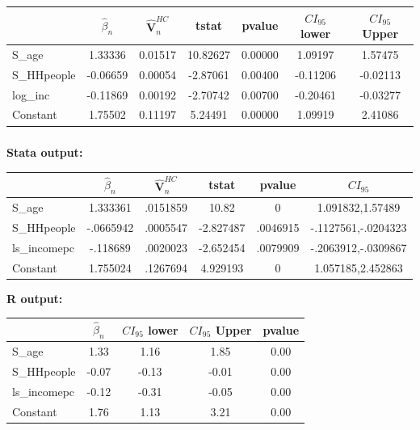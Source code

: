 \documentclass[12pt]{article}
\begin{document}
\begin{table}[ht]
\begin{tabular}{lcccccc}
  \hline
  &           $\hat \beta_n$&         $\mathbf{\hat V}_n^{HC}$ &           t\-stat &           p\-value &        $CI_{95}$ lower &  $CI_{95}$ Upper\\
  \hline
    S\_age & 1.33336 & 0.01517 & 10.82627 & 0.00000 & 1.09197 & 1.57475 \\
    S\_HHpeople & -0.06659 & 0.00054 & -2.87061 & 0.00400 & -0.11206 & -0.02113 \\
    log\_inc & -0.11869 & 0.00192 & -2.70742 & 0.00700 & -0.20461 & -0.03277 \\
  Constant & 1.75502 & 0.11197 & 5.24491 & 0.00000 & 1.09919 & 2.41086 \\
   \hline
\end{tabular}
\end{table}


\newpage
\subsubsection{}
\textbf{Stata output:}\\


\begin{tabular}{lccccc}
 &           $\hat \beta_n$&         $\mathbf{\hat V}_n^{HC}$ &           t\-stat &           p\-value &        $CI_{95}$\\
\hline
S\_age       &    1.333361&    .0151859&       10.82&           0 &1.091832,1.57489\\
S\_HHpeople  &   -.0665942&    .0005547&   -2.827487&    .0046915&-.1127561,-.0204323\\
ls\_incomepc &    -.118689&    .0020023&   -2.652454&    .0079909&-.2063912,-.0309867\\
Constant       &    1.755024&    .1267694&    4.929193&    0 & 1.057185,2.452863\\
\hline
\end{tabular}

\textbf{R output:}\\


\begin{tabular}{lcccc}
  \hline
  & $\hat \beta_n$&  $CI_{95}$ lower &  $CI_{95}$ Upper & p\-value \\
   \hline
   S\_age & 1.33 & 1.16 & 1.85 & 0.00 \\
   S\_HHpeople & -0.07 & -0.13 & -0.01 & 0.00 \\
  ls\_incomepc & -0.12 & -0.31 & -0.05 & 0.00 \\
   Constant & 1.76 & 1.13 & 3.21 & 0.00 \\
    \hline
\end{tabular}
\end{document}
